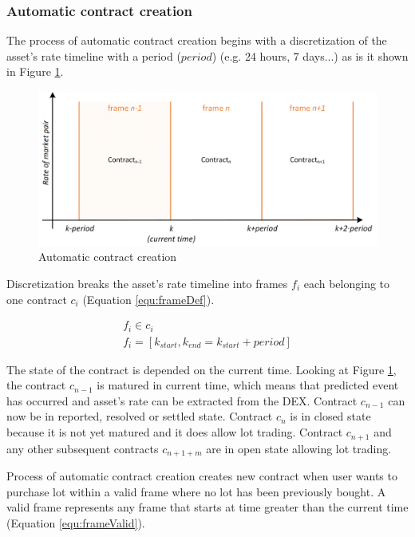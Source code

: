 \documentclass{article}
\begin{document}
	\subsubsection{Automatic contract creation}
	
	The process of automatic contract creation begins with a discretization of the asset's rate timeline with a period ($period$) (e.g. 24 hours, 7 days...) as is it shown in Figure \ref{fig:acc}.
	
	\begin{figure}[h]
		\centering
		\includegraphics[scale=0.75]{images/horizon.png}
		\caption{Automatic contract creation}
		\label{fig:acc}
	\end{figure}
	
	Discretization breaks the asset's rate timeline into frames $f_i$ each belonging to one contract $c_i$ (Equation \ref{equ:frameDef}).
	
	\begin{gather}
		f_i\in c_i\nonumber\\
		f_i=[k_{start}, k_{end}=k_{start}+period]
		\label{equ:frameDef}
	\end{gather}
	
	The state of the contract is depended on the current time. Looking at Figure \ref{fig:acc}, the contract $c_{n-1}$ is matured in current time, which means that predicted event has occurred and asset's rate can be extracted from the DEX. Contract $c_{n-1}$ can now be in reported, resolved or settled state. Contract $c_{n}$ is in closed state because it is not yet matured and it does allow lot trading. Contract $c_{n+1}$ and any other subsequent contracts $c_{n+1+m}$ are in open state allowing lot trading.  
	
	Process of automatic contract creation creates new contract when user wants to purchase lot within a valid frame where no lot has been previously bought. A valid frame represents any frame that starts at time greater than the current time (Equation \ref{equ:frameValid}). 
	
\end{document}
